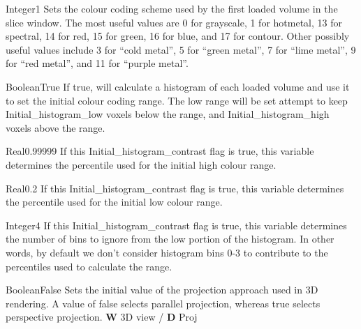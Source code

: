 

 {Integer}{1} {Sets the
  colour coding scheme used by the first loaded volume in the slice
  window. The most useful values are 0 for grayscale, 1 for hotmetal,
  13 for spectral, 14 for red, 15 for green, 16 for blue, and 17 for
  contour. Other possibly useful values include 3 for ``cold metal'',
  5 for ``green metal'', 7 for ``lime metal'', 9 for ``red metal'',
  and 11 for ``purple metal''.}{}

{Boolean}{True}
{If true, \display{} will calculate a histogram of each loaded volume
  and use it to set the initial colour coding range. The low range will
  be set attempt to keep Initial\_histogram\_low voxels below the range,
  and Initial\_histogram\_high voxels above the range.}{}

{Real}{0.99999}
{If this Initial\_histogram\_contrast flag is true, this variable
  determines the percentile used for the initial high colour range.}{}

{Real}{0.2}
{If this Initial\_histogram\_contrast flag is true, this variable
  determines the percentile used for the initial low colour range.}{}

{Integer}{4}
{If this Initial\_histogram\_contrast flag is true, this variable
 determines the number of bins to ignore from the low portion of the 
histogram. In other words, by default we don't consider histogram bins
0-3 to contribute to the percentiles used to calculate the range.}{}

{Boolean}{False}
{Sets the initial value of the projection approach used in 3D rendering. A value of false selects parallel projection, whereas true selects perspective projection.}
{{\bf W} 3D view / {\bf D} Proj}

